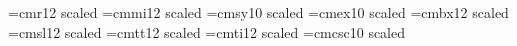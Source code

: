  
\ifx\tenpoint\undefined\let\loadedfrommacro=Y
         
         \let\loadedfrommacro=N\fi
 
\font\fourteenrm=cmr12 scaled 
\font\fourteeni=cmmi12 scaled 
\font\fourteensy=cmsy10 scaled 
\font\fourteenex=cmex10 scaled 
\font\fourteenbf=cmbx12 scaled 
\font\fourteensl=cmsl12 scaled 
\font\fourteentt=cmtt12 scaled 
\font\fourteenit=cmti12 scaled 
\font\fourteencsc=cmcsc10 scaled 
 
\ifx\fourteenpoint\undefined
   \def\fourteenpoint{\def\rm{\fam0\fourteenrm}%
       \textfont0=\fourteenrm \scriptfont0=\tenrm \scriptscriptfont0=\sevenrm
       \textfont1=\fourteeni  \scriptfont1=\teni  \scriptscriptfont1=\seveni
       \textfont2=\fourteensy \scriptfont2=\tensy \scriptscriptfont2=\sevensy
       \textfont3=\fourteenex \scriptfont3=\fourteenex
                              \scriptscriptfont3=\fourteenex
       \textfont\itfam=\fourteenit  \def\it{\fam\itfam\fourteenit}%
       \textfont\slfam=\fourteensl  \def\sl{\fam\slfam\fourteensl}%
       \textfont\ttfam=\fourteentt  \def\tt{\fam\ttfam\fourteentt}%
       \textfont\bffam=\fourteenbf  \scriptfont\bffam=\tenbf
        \scriptscriptfont\bffam=\sevenbf  \def\bf{\fam\bffam\fourteenbf}%
       \textfont\scfam=\fourteencsc \def\sc{\fam\scfam\fourteencsc}%
       \normalbaselineskip=17pt
       \setbox\strutbox=\hbox{\vrule height11.9pt depth6.3pt width0pt}%
       \normalbaselines\rm}
   \fi
